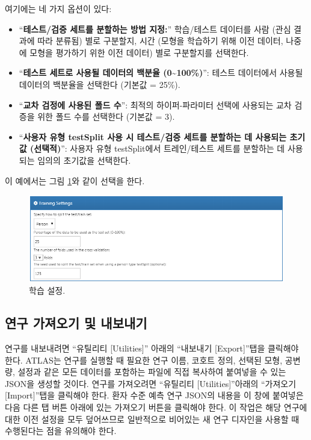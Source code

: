 \documentclass[11pt]{book}
\providecommand{\tightlist}{%
  \setlength{\itemsep}{0pt}\setlength{\parskip}{0pt}}
\theoremstyle{definition}
\theoremstyle{definition}
\theoremstyle{definition}
\theoremstyle{remark}
\begin{document}
여기에는 네 가지 옵션이 있다:

\begin{itemize}
\tightlist
\item
  ``\textbf{테스트/검증 세트를 분할하는 방법 지정:}'' 학습/테스트
  데이터를 사람 (관심 결과에 따라 분류됨) 별로 구분할지, 시간 (모형을
  학습하기 위해 이전 데이터, 나중에 모형을 평가하기 위한 이전 데이터)
  별로 구분할지를 선택한다.
\item
  ``\textbf{테스트 세트로 사용될 데이터의 백분율
  (0\textasciitilde{}100\%)}'': 테스트 데이터에서 사용될 데이터의
  백분율을 선택한다 (기본값 = 25\%).
\item
  ``\textbf{교차 검정에 사용된 폴드 수}'': 최적의 하이퍼-파라미터 선택에
  사용되는 교차 검증을 위한 폴드 수를 선택한다 (기본값 = 3).
\item
  ``\textbf{사용자 유형 testSplit 사용 시 테스트/검증 세트를 분할하는 데
  사용되는 초기값 (선택적)}'': 사용자 유형 testSplit에서 트레인/테스트
  세트를 분할하는 데 사용되는 임의의 초기값을 선택한다.
\end{itemize}

이 예에서는 그림 \ref{fig:trainingSettings}와 같이 선택을 한다.

\begin{figure}

{\centering \includegraphics[width=1\linewidth]{images/PatientLevelPrediction/trainingSettings} 

}

\caption{학습 설정.}\label{fig:trainingSettings}
\end{figure}

\subsection{연구 가져오기 및 내보내기}\label{---}

연구를 내보내려면 ``유틸리티 {[}Utilities{]}'' 아래의 ``내보내기
{[}Export{]}''탭을 클릭해야 한다. ATLAS는 연구를 실행할 때 필요한 연구
이름, 코호트 정의, 선택된 모형, 공변량, 설정과 같은 모든 데이터를
포함하는 파일에 직접 복사하여 붙여넣을 수 있는 JSON을 생성할 것이다.
연구를 가져오려면 ``유틸리티 {[}Utilities{]}''아래의 ``가져오기
{[}Import{]}''탭을 클릭해야 한다. 환자 수준 예측 연구 JSON의 내용을 이
창에 붙여넣은 다음 다른 탭 버튼 아래에 있는 가져오기 버튼을 클릭해야
한다. 이 작업은 해당 연구에 대한 이전 설정을 모두 덮어쓰므로 일반적으로
비어있는 새 연구 디자인을 사용할 때 수행된다는 점을 유의해야 한다.
\end{document}
